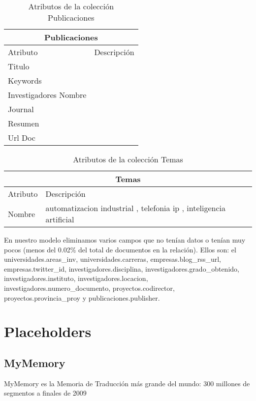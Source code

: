 \begin{center}
\begin{table}
\centering
\begin{tabular}{|  l | l |}
\hline
\multicolumn{2}{|c|}{Publicaciones} \\ \hline
Atributo & Descripción \\ \hline
Titulo & \\ \hline 
Keywords & \\ \hline 
Investigadores Nombre & \\ \hline 
Journal & \\ \hline 
Resumen & \\ \hline 
Url Doc  & \\ \hline 
\end{tabular}
\caption{Atributos de la colección Publicaciones}
\label{table:publicaciones}
\end{table}
\end{center}

\begin{center}
\begin{table}
\begin{tabular}{|  l | l |}
\hline
\multicolumn{2}{|c|}{Temas} \\ \hline
Atributo & Descripción \\ \hline
Nombre &  automatizacion industrial , telefonia ip , inteligencia artificial\\ \hline 
\end{tabular}
\caption{Atributos de la colección Temas}
\label{table:temas}
\end{table}
\end{center}

En nuestro modelo eliminamos varios campos que no tenían datos o tenían muy pocos (menos del 0.02\% del total de documentos en la relación). Ellos son: el universidades.areas\_inv, universidades.carreras, empresas.blog\_rss\_url, empresas.twitter\_id, investigadores.disciplina, investigadores.grado\_obtenido, investigadores.instituto, investigadores.locacion, investigadores.numero\_documento, proyectos.codirector, proyectos.provincia\_proy y publicaciones.publisher.


\chapter{Placeholders}
\section{MyMemory}
MyMemory es la Memoria de Traducción más grande del mundo: 300 millones de segmentos a finales de 2009

